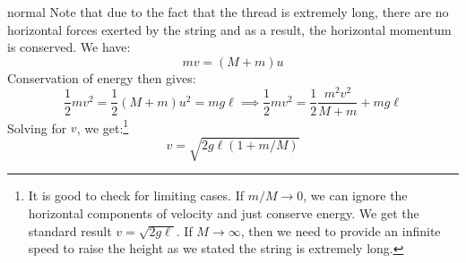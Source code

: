 \begin{solution}{normal}
Note that due to the fact that the thread is extremely long,  there are no horizontal forces exerted by the string and as a result, the horizontal momentum is conserved. We have:
$$mv=(M+m)u$$
Conservation of energy then gives:
$$\frac{1}{2}mv^2 = \frac{1}{2}(M+m)u^2 = mg\ell \implies \frac{1}{2}mv^2 = \frac{1}{2}\frac{m^2v^2}{M+m}+mg\ell$$
Solving for $v$, we get:\footnote{It is good to check for limiting cases. If $m/M \to 0$, we can ignore the horizontal components of velocity and just conserve energy. We get the standard result $v=\sqrt{2g\ell}$. If $M \to \infty$, then we need to provide an infinite speed to raise the height as we stated the string is extremely long.}
$$v=\sqrt{2g\ell\left(1+m/M\right)}$$
\end{solution}

